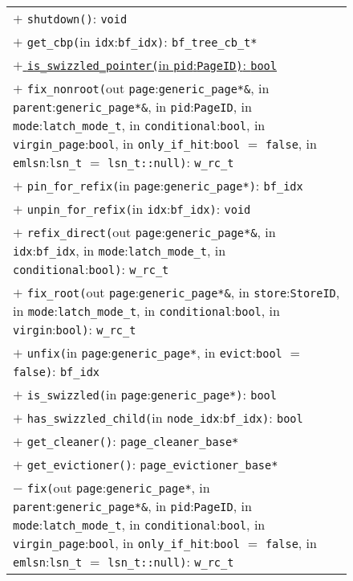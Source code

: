 \begin{@empty}
\begin{figure}[ht!]
{\begin{tabularx}{\textwidth}{|X|}
			$+$ \texttt{shutdown()}: \texttt{void}																															\\
			$+$ \texttt{get\_cbp(}in \texttt{idx}:\texttt{bf\_idx)}: \texttt{bf\_tree\_cb\_t*}																								\\
			\uline{$+$ \texttt{is\_swizzled\_pointer(}in \texttt{pid}:\texttt{PageID)}: \texttt{bool}}																						\\
			$+$ \texttt{fix\_nonroot(}out \texttt{page}:\texttt{generic\_page*\&}, in \texttt{parent}:\texttt{generic\_page*\&}, in \texttt{pid}:\texttt{PageID}, in \texttt{mode}:\texttt{latch\_mode\_t}, in \texttt{conditional}:\texttt{bool}, in \texttt{virgin\_page}:\texttt{bool}, in \texttt{only\_if\_hit}:\texttt{bool} $=$ \texttt{false}, in \texttt{emlsn}:\texttt{lsn\_t} $=$ \texttt{lsn\_t::null)}: \texttt{w\_rc\_t}												\\
			$+$ \texttt{pin\_for\_refix(}in \texttt{page}:\texttt{generic\_page*)}: \texttt{bf\_idx}																							\\
			$+$ \texttt{unpin\_for\_refix(}in \texttt{idx}:\texttt{bf\_idx)}: \texttt{void}																									\\
			$+$ \texttt{refix\_direct(}out \texttt{page}:\texttt{generic\_page*\&}, in \texttt{idx}:\texttt{bf\_idx}, in \texttt{mode}:\texttt{latch\_mode\_t}, in \texttt{conditional}:\texttt{bool)}: \texttt{w\_rc\_t}			\\
			$+$ \texttt{fix\_root(}out \texttt{page}:\texttt{generic\_page*\&}, in \texttt{store}:\texttt{StoreID}, in \texttt{mode}:\texttt{latch\_mode\_t}, in \texttt{conditional}:\texttt{bool}, in \texttt{virgin}:\texttt{bool)}: \texttt{w\_rc\_t}																																										\\
			$+$ \texttt{unfix(}in \texttt{page}:\texttt{generic\_page*}, in \texttt{evict}:\texttt{bool} $=$ \texttt{false)}: \texttt{bf\_idx}																\\
			$+$ \texttt{is\_swizzled(}in \texttt{page}:\texttt{generic\_page*)}: \texttt{bool}																							\\
			$+$ \texttt{has\_swizzled\_child(}in \texttt{node\_idx}:\texttt{bf\_idx)}: \texttt{bool}																						\\
			$+$ \texttt{get\_cleaner()}: \texttt{page\_cleaner\_base*}																											\\
			$+$ \texttt{get\_evictioner()}: \texttt{page\_evictioner\_base*}																										\\
			$-$ \texttt{fix(}out \texttt{page}:\texttt{generic\_page*}, in \texttt{parent}:\texttt{generic\_page*\&}, in \texttt{pid}:\texttt{PageID}, in \texttt{mode}:\texttt{latch\_mode\_t}, in \texttt{conditional}:\texttt{bool}, in \texttt{virgin\_page}:\texttt{bool}, in \texttt{only\_if\_hit}:\texttt{bool} $=$ \texttt{false}, in \texttt{emlsn}:\texttt{lsn\_t} $=$ \texttt{lsn\_t::null)}: \texttt{w\_rc\_t}												\\

\end{tabularx}}
\end{figure}
\end{@empty}
